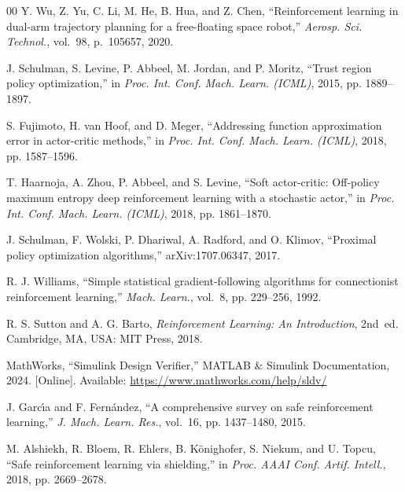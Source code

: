 \documentclass{ieeeaccess}
\begin{document}
\begin{thebibliography}{00}
Y. Wu, Z. Yu, C. Li, M. He, B. Hua, and Z. Chen, ``Reinforcement
learning in dual-arm trajectory planning for a free-floating space robot,'' \emph{Aerosp. Sci. Technol.}, vol.~98,
p.~105657, 2020.



J. Schulman, S. Levine, P. Abbeel, M. Jordan, and P. Moritz, ``Trust region policy
optimization,'' in \emph{Proc. Int. Conf. Mach. Learn. (ICML)}, 2015, pp. 1889--1897.



S. Fujimoto, H. van Hoof, and D. Meger, ``Addressing function approximation error in actor-critic
methods,'' in \emph{Proc. Int. Conf. Mach. Learn. (ICML)}, 2018, pp. 1587--1596.



T. Haarnoja, A. Zhou, P. Abbeel, and S. Levine, ``Soft actor-critic: Off-policy maximum entropy
deep reinforcement learning with a stochastic actor,'' in \emph{Proc. Int. Conf. Mach. Learn. (ICML)},
2018, pp. 1861--1870.



J. Schulman, F. Wolski, P. Dhariwal, A. Radford, and O. Klimov, ``Proximal policy optimization
algorithms,'' arXiv:1707.06347, 2017.



 R. J. Williams, ``Simple statistical gradient-following algorithms for connectionist
reinforcement learning,'' \emph{Mach. Learn.}, vol.~8, pp. 229--256, 1992.



R. S. Sutton and A. G. Barto, \emph{Reinforcement Learning: An Introduction}, 2nd~ed. Cambridge, MA,
USA: MIT Press, 2018.



 MathWorks, ``Simulink Design Verifier,'' MATLAB \& Simulink Documentation, 2024. [Online].
Available: \url{https://www.mathworks.com/help/sldv/}



 J. Garc{\'\i}a and F. Fern{\'a}ndez, ``A comprehensive survey on safe reinforcement
learning,'' \emph{J. Mach. Learn. Res.}, vol.~16, pp. 1437--1480, 2015.



M. Alshiekh, R. Bloem, R. Ehlers, B. K{\"o}nighofer, S. Niekum, and U. Topcu, ``Safe
reinforcement learning via shielding,'' in \emph{Proc. AAAI Conf. Artif. Intell.}, 2018, pp. 2669--2678.




\end{thebibliography}
\end{document}
